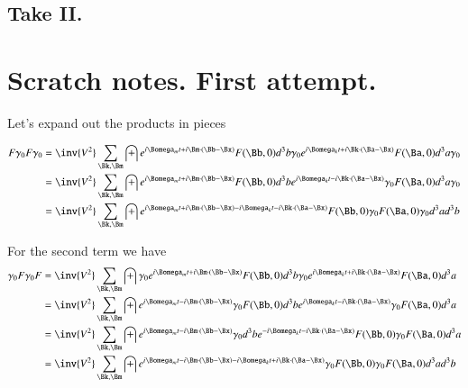 \documentclass{article}
\begin{document}
\subsection{ Take II. }

\section{ Scratch notes.  First attempt. }

Let's expand out the products in pieces 

\begin{align*}
F \gamma_0 F \gamma_0 
&=
\inv{V^2} \sum_{\Bk,\Bm} 
\int e^{i \Bomega_m t + i \Bm \cdot (\Bb-\Bx) } F(\Bb, 0) d^3 b \gamma_0
e^{i \Bomega_k t + i \Bk \cdot (\Ba-\Bx) } F(\Ba, 0) d^3 a \gamma_0 \\
&=
\inv{V^2} \sum_{\Bk,\Bm} 
\int e^{i \Bomega_m t + i \Bm \cdot (\Bb-\Bx) } F(\Bb, 0) d^3 b 
e^{i \Bomega_k t - i \Bk \cdot (\Ba-\Bx) } \gamma_0 F(\Ba, 0) d^3 a \gamma_0 \\
&=
\inv{V^2} \sum_{\Bk,\Bm} 
\int e^{i \Bomega_m t + i \Bm \cdot (\Bb-\Bx) -i \Bomega_k t - i \Bk \cdot (\Ba-\Bx) } F(\Bb, 0) \gamma_0 F(\Ba, 0) \gamma_0 d^3 a d^3 b \\
\end{align*}

For the second term we have
\begin{align*}
\gamma_0 F \gamma_0 F 
&=
\inv{V^2} \sum_{\Bk,\Bm} \int
\gamma_0 e^{i \Bomega_m t + i \Bm \cdot (\Bb-\Bx) } F(\Bb, 0) d^3 b \gamma_0 e^{i \Bomega_k t + i \Bk \cdot (\Ba-\Bx) } F(\Ba, 0) d^3 a  \\
&=
\inv{V^2} \sum_{\Bk,\Bm} \int
e^{i \Bomega_m t - i \Bm \cdot (\Bb-\Bx) } \gamma_0 F(\Bb, 0) d^3 b e^{i \Bomega_k t - i \Bk \cdot (\Ba-\Bx) } \gamma_0 F(\Ba, 0) d^3 a  \\
&=
\inv{V^2} \sum_{\Bk,\Bm} \int
e^{i \Bomega_m t - i \Bm \cdot (\Bb-\Bx) } \gamma_0 d^3 b e^{-i \Bomega_k t - i \Bk \cdot (\Ba-\Bx) } F(\Bb, 0) \gamma_0 F(\Ba, 0) d^3 a  \\
&=
\inv{V^2} \sum_{\Bk,\Bm} \int
e^{i \Bomega_m t - i \Bm \cdot (\Bb-\Bx) -i \Bomega_k t + i \Bk \cdot (\Ba-\Bx) } \gamma_0 F(\Bb, 0) \gamma_0 F(\Ba, 0) d^3 a d^3 b  \\
\end{align*}
\end{document}
